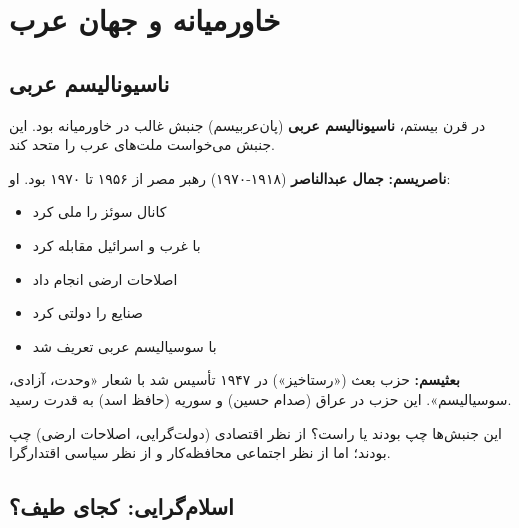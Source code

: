 \section{خاورمیانه و جهان عرب}

\subsection{ناسیونالیسم عربی}


در قرن بیستم، \textbf{ناسیونالیسم عربی} (پان‌عربیسم) جنبش غالب در خاورمیانه بود. این جنبش می‌خواست ملت‌های عرب را متحد کند.

\textbf{ناصریسم:}
\textbf{جمال عبدالناصر} (۱۹۱۸-۱۹۷۰) رهبر مصر از ۱۹۵۶ تا ۱۹۷۰ بود. او:
\begin{itemize}
    \item کانال سوئز را ملی کرد
    \item با غرب و اسرائیل مقابله کرد
    \item اصلاحات ارضی انجام داد
    \item صنایع را دولتی کرد
    \item با سوسیالیسم عربی تعریف شد
\end{itemize}

\textbf{بعثیسم:}
حزب بعث («رستاخیز») در ۱۹۴۷ تأسیس شد با شعار «وحدت، آزادی، سوسیالیسم». این حزب در عراق (صدام حسین) و سوریه (حافظ اسد) به قدرت رسید.

این جنبش‌ها چپ بودند یا راست؟ از نظر اقتصادی (دولت‌گرایی، اصلاحات ارضی) چپ بودند؛ اما از نظر اجتماعی محافظه‌کار و از نظر سیاسی اقتدارگرا.


\subsection{اسلام‌گرایی: کجای طیف؟}

